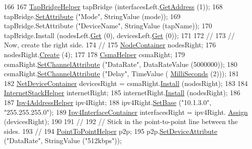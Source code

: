 \begin{DoxyCode}
166 
167   \hyperlink{classns3_1_1TapBridgeHelper}{TapBridgeHelper} tapBridge (interfacesLeft.\hyperlink{classns3_1_1Ipv4InterfaceContainer_ae63208dcd222be986822937ee4aa828c}{GetAddress} (1));
168   tapBridge.\hyperlink{classns3_1_1TapBridgeHelper_ac13f757f82c0ee66504693ede7230397}{SetAttribute} (\textcolor{stringliteral}{"Mode"}, StringValue (mode));
169   tapBridge.SetAttribute (\textcolor{stringliteral}{"DeviceName"}, StringValue (tapName));
170   tapBridge.Install (nodesLeft.\hyperlink{classns3_1_1NodeContainer_a9ed96e2ecc22e0f5a3d4842eb9bf90bf}{Get} (0), devicesLeft.\hyperlink{classns3_1_1NetDeviceContainer_a677d62594b5c9d2dea155cc5045f4d0b}{Get} (0));
171 
172   \textcolor{comment}{//}
173   \textcolor{comment}{// Now, create the right side.}
174   \textcolor{comment}{//}
175   \hyperlink{classns3_1_1NodeContainer}{NodeContainer} nodesRight;
176   nodesRight.\hyperlink{classns3_1_1NodeContainer_a787f059e2813e8b951cc6914d11dfe69}{Create} (4);
177 
178   \hyperlink{classns3_1_1CsmaHelper}{CsmaHelper} csmaRight;
179   csmaRight.\hyperlink{classns3_1_1CsmaHelper_a886d900b2fe44433e0b81752dea7e7f1}{SetChannelAttribute} (\textcolor{stringliteral}{"DataRate"}, DataRateValue (5000000));
180   csmaRight.\hyperlink{classns3_1_1CsmaHelper_a886d900b2fe44433e0b81752dea7e7f1}{SetChannelAttribute} (\textcolor{stringliteral}{"Delay"}, TimeValue (
      \hyperlink{group__timecivil_gaf26127cf4571146b83a92ee18679c7a9}{MilliSeconds} (2)));
181 
182   \hyperlink{classns3_1_1NetDeviceContainer}{NetDeviceContainer} devicesRight = csmaRight.\hyperlink{classns3_1_1CsmaHelper_af79a91372595230b0817200270ab84e7}{Install} (nodesRight);
183 
184   \hyperlink{classns3_1_1InternetStackHelper}{InternetStackHelper} internetRight;
185   internetRight.\hyperlink{classns3_1_1InternetStackHelper_a6645b412f31283d2d9bc3d8a95cebbc0}{Install} (nodesRight);
186 
187   \hyperlink{classns3_1_1Ipv4AddressHelper}{Ipv4AddressHelper} ipv4Right;
188   ipv4Right.\hyperlink{classns3_1_1Ipv4AddressHelper_acf7b16dd25bac67e00f5e25f90a9a035}{SetBase} (\textcolor{stringliteral}{"10.1.3.0"}, \textcolor{stringliteral}{"255.255.255.0"});
189   \hyperlink{classns3_1_1Ipv4InterfaceContainer}{Ipv4InterfaceContainer} interfacesRight = ipv4Right.
      \hyperlink{classns3_1_1Ipv4AddressHelper_af8e7f4a1a7e74c00014a1eac445a27af}{Assign} (devicesRight);
190 
191   \textcolor{comment}{//}
192   \textcolor{comment}{// Stick in the point-to-point line between the sides.}
193   \textcolor{comment}{//}
194   \hyperlink{classns3_1_1PointToPointHelper}{PointToPointHelper} p2p;
195   p2p.\hyperlink{classns3_1_1PointToPointHelper_a4577f5ab8c387e5528af2e0fbab1152e}{SetDeviceAttribute} (\textcolor{stringliteral}{"DataRate"}, StringValue (\textcolor{stringliteral}{"512kbps"}));

\end{DoxyCode}

